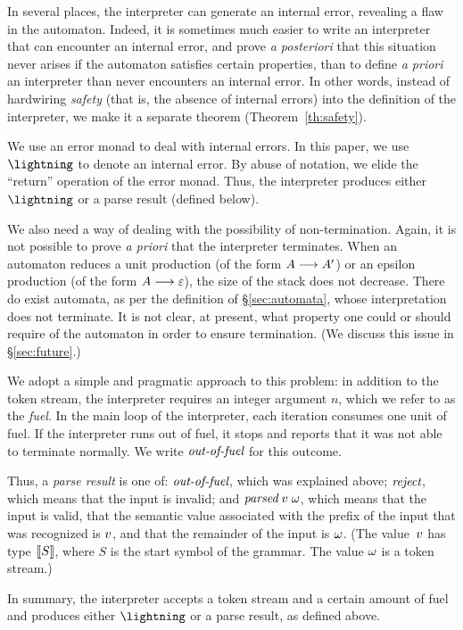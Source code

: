 \documentclass{llncs}
\let\epsilon\varepsilon %
\begin{document}
In several places, the interpreter can generate an internal error, revealing a
flaw in the automaton. Indeed, it is sometimes much easier to write an
interpreter that can encounter an internal error, and prove \emph{a
posteriori} that this situation never arises if the automaton satisfies
certain properties, than to define \emph{a priori} an interpreter than never
encounters an internal error. In other words, instead of
hardwiring \emph{safety} (that is, the absence of internal errors) into the
definition of the interpreter, we make it a separate theorem
(Theorem~\ref{th:safety}).

We use an error monad to deal with internal errors. In this paper, we use
$\Err$ to denote an internal error. By abuse of notation, we elide the
``return'' operation of the error monad. Thus, the interpreter produces either
$\Err$ or a parse result (defined below).

We also need a way of dealing with the possibility of non-termination. Again,
it is not possible to prove \emph{a priori} that the interpreter terminates.
When an \lr automaton reduces a unit production (of the form
$A\longrightarrow A'$) or an epsilon production (of the form
$\produ\nonterm\epsilon$), the size of the stack does not decrease.
There do exist automata, as per the definition of \S\ref{sec:automata}, whose
interpretation does not terminate. It is not clear, at present, what property
one could or should require of the automaton in order to ensure
termination. (We discuss this issue in \S\ref{sec:future}.)

We adopt a simple and pragmatic approach to this problem: in addition to the
token stream, the interpreter requires an integer argument $n$, which we
refer to as the \emph{fuel}.  In the main loop of the interpreter,
each iteration consumes one unit of fuel.  If the interpreter runs out of
fuel, it stops and reports that it was not able to terminate normally.
We write $\textit{out-of-fuel}$ for this outcome.

Thus, a \emph{parse result} is one of: $\textit{out-of-fuel}$, which was explained above;
$\textit{reject}$, which means that the input is invalid; and $\textit{parsed}\;v\;\omega$,
which means that the input is valid, that the semantic value associated with
the prefix of the input that was recognized is $v$, and that the remainder
of the input is $\omega$. (The value~$v$ has type $\llbracket S\rrbracket$, where $S$ is
the start symbol of the grammar. The value $\omega$ is a token stream.)

In summary, the interpreter accepts a token stream and a certain amount of
fuel and produces either $\Err$ or a parse result, as defined above.
\end{document}
